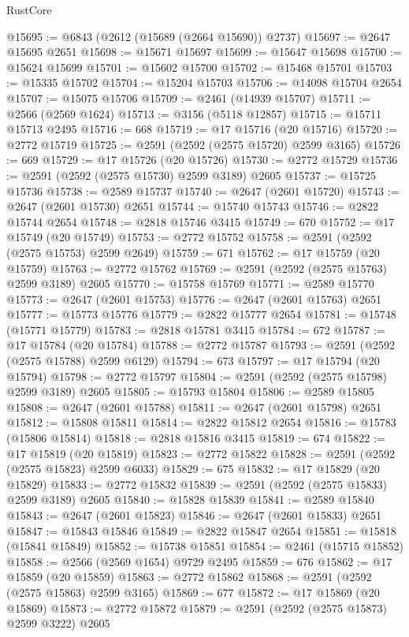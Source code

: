 \begin{lexlean}{RustCore}
\begin{coremodule}
@15695 := @6843 (@2612 (@15689 (@2664 @15690)) @2737)
@15697 := @2647 @15695 @2651
@15698 := @15671 @15697
@15699 := @15647 @15698
@15700 := @15624 @15699
@15701 := @15602 @15700
@15702 := @15468 @15701
@15703 := @15335 @15702
@15704 := @15204 @15703
@15706 := @14098 @15704 @2654
@15707 := @15075 @15706
@15709 := @2461 (@14939 @15707)
@15711 := @2566 (@2569 @1624)
@15713 := @3156 (@5118 @12857)
@15715 := @15711 @15713 @2495
@15716 := 668
@15719 := @17 @15716 (@20 @15716)
@15720 := @2772 @15719
@15725 := @2591 (@2592 (@2575 @15720) @2599 @3165)
@15726 := 669
@15729 := @17 @15726 (@20 @15726)
@15730 := @2772 @15729
@15736 := @2591 (@2592 (@2575 @15730) @2599 @3189) @2605
@15737 := @15725 @15736
@15738 := @2589 @15737
@15740 := @2647 (@2601 @15720)
@15743 := @2647 (@2601 @15730) @2651
@15744 := @15740 @15743
@15746 := @2822 @15744 @2654
@15748 := @2818 @15746 @3415
@15749 := 670
@15752 := @17 @15749 (@20 @15749)
@15753 := @2772 @15752
@15758 := @2591 (@2592 (@2575 @15753) @2599 @2649)
@15759 := 671
@15762 := @17 @15759 (@20 @15759)
@15763 := @2772 @15762
@15769 := @2591 (@2592 (@2575 @15763) @2599 @3189) @2605
@15770 := @15758 @15769
@15771 := @2589 @15770
@15773 := @2647 (@2601 @15753)
@15776 := @2647 (@2601 @15763) @2651
@15777 := @15773 @15776
@15779 := @2822 @15777 @2654
@15781 := @15748 (@15771 @15779)
@15783 := @2818 @15781 @3415
@15784 := 672
@15787 := @17 @15784 (@20 @15784)
@15788 := @2772 @15787
@15793 := @2591 (@2592 (@2575 @15788) @2599 @6129)
@15794 := 673
@15797 := @17 @15794 (@20 @15794)
@15798 := @2772 @15797
@15804 := @2591 (@2592 (@2575 @15798) @2599 @3189) @2605
@15805 := @15793 @15804
@15806 := @2589 @15805
@15808 := @2647 (@2601 @15788)
@15811 := @2647 (@2601 @15798) @2651
@15812 := @15808 @15811
@15814 := @2822 @15812 @2654
@15816 := @15783 (@15806 @15814)
@15818 := @2818 @15816 @3415
@15819 := 674
@15822 := @17 @15819 (@20 @15819)
@15823 := @2772 @15822
@15828 := @2591 (@2592 (@2575 @15823) @2599 @6033)
@15829 := 675
@15832 := @17 @15829 (@20 @15829)
@15833 := @2772 @15832
@15839 := @2591 (@2592 (@2575 @15833) @2599 @3189) @2605
@15840 := @15828 @15839
@15841 := @2589 @15840
@15843 := @2647 (@2601 @15823)
@15846 := @2647 (@2601 @15833) @2651
@15847 := @15843 @15846
@15849 := @2822 @15847 @2654
@15851 := @15818 (@15841 @15849)
@15852 := @15738 @15851
@15854 := @2461 (@15715 @15852)
@15858 := @2566 (@2569 @1654) @9729 @2495
@15859 := 676
@15862 := @17 @15859 (@20 @15859)
@15863 := @2772 @15862
@15868 := @2591 (@2592 (@2575 @15863) @2599 @3165)
@15869 := 677
@15872 := @17 @15869 (@20 @15869)
@15873 := @2772 @15872
@15879 := @2591 (@2592 (@2575 @15873) @2599 @3222) @2605

\end{coremodule}
\end{lexlean}
